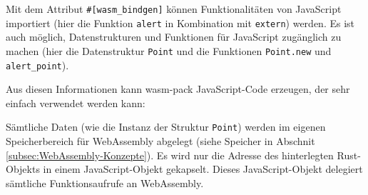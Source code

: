 Mit dem Attribut \lstinline{#[wasm_bindgen]} können Funktionalitäten von JavaScript importiert (hier die Funktion \lstinline{alert} in Kombination mit \lstinline{extern}) werden. Es ist auch möglich, Datenstrukturen und Funktionen für JavaScript zugänglich zu machen (hier die Datenstruktur \lstinline{Point} und die Funktionen \lstinline{Point.new} und \lstinline{alert_point}).

Aus diesen Informationen kann wasm-pack JavaScript-Code erzeugen, der sehr einfach verwendet werden kann:



Sämtliche Daten (wie die Instanz der Struktur \lstinline{Point}) werden im eigenen Speicherbereich für WebAssembly abgelegt (siehe Speicher in Abschnit \ref{subsec:WebAssembly-Konzepte}). Es wird nur die Adresse des hinterlegten Rust-Objekts in einem JavaScript-Objekt gekapselt. Dieses JavaScript-Objekt delegiert sämtliche Funktionsaufrufe an WebAssembly.
